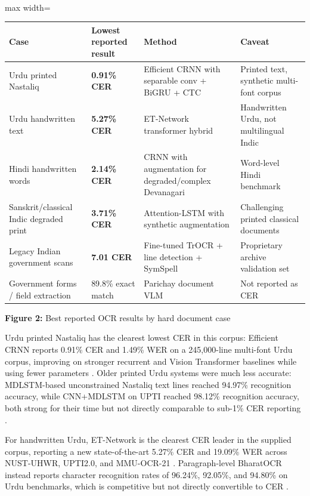     
    \mbox{}\\
    \begin{adjustbox}{max width=\textwidth}
    \begin{tabular}{p{4.0cm} | p{4.0cm} | p{4.0cm} | p{4.0cm}}
    \hline
    Case & Lowest reported result & Method & Caveat \\
    \hline
    Urdu printed Nastaliq & \textbf{0.91\% CER} & Efficient CRNN with separable conv + BiGRU + CTC & Printed text, synthetic multi-font corpus  \cite{Nasir2024Efficient} \\
    Urdu handwritten text & \textbf{5.27\% CER} & ET-Network transformer hybrid & Handwritten Urdu, not multilingual Indic  \cite{Hamza2024ET-Network:} \\
    Hindi handwritten words & \textbf{2.14\% CER} & CRNN with augmentation for degraded/complex Devanagari & Word-level Hindi benchmark  \cite{Kumar2026Enhancing} \\
    Sanskrit/classical Indic degraded print & \textbf{3.71\% CER} & Attention-LSTM with synthetic augmentation & Challenging printed classical documents  \cite{Dwivedi2020An} \\
    Legacy Indian government scans & \textbf{7.01 CER} & Fine-tuned TrOCR + line detection + SymSpell & Proprietary archive validation set  \cite{Meghana2025Enhanced} \\
    Government forms / field extraction & 89.8\% exact match & Parichay document VLM & Not reported as CER  \cite{Faraz2026Designing} \\
    \hline
    \end{tabular}
    \end{adjustbox}
    
    
    \textbf{Figure 2:} Best reported OCR results by hard document case
    
    
    Urdu printed Nastaliq has the clearest lowest CER in this corpus: Efficient CRNN reports 0.91\% CER and 1.49\% WER on a 245,000-line multi-font Urdu corpus, improving on stronger recurrent and Vision Transformer baselines while using fewer parameters  \cite{Nasir2024Efficient}. Older printed Urdu systems were much less accurate: MDLSTM-based unconstrained Nastaliq text lines reached 94.97\% recognition accuracy, while CNN+MDLSTM on UPTI reached 98.12\% recognition accuracy, both strong for their time but not directly comparable to sub-1\% CER reporting  \cite{Naz2017Urdu}.
    
    
    For handwritten Urdu, ET-Network is the clearest CER leader in the supplied corpus, reporting a new state-of-the-art 5.27\% CER and 19.09\% WER across NUST-UHWR, UPTI2.0, and MMU-OCR-21  \cite{Hamza2024ET-Network:}. Paragraph-level BharatOCR instead reports character recognition rates of 96.24\%, 92.05\%, and 94.80\% on Urdu benchmarks, which is competitive but not directly convertible to CER  \cite{Dey2025Handwritten}.
    
